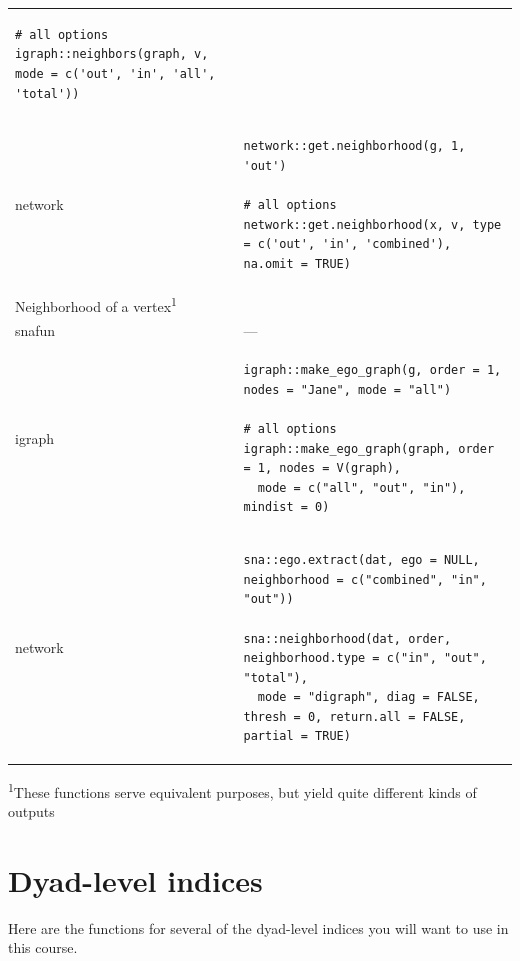 \documentclass[
]{article}
\begin{document}
\begin{longtable}{ll}
\begin{verbatim}
# all options
igraph::neighbors(graph, v, mode = c('out', 'in', 'all', 'total'))
\end{verbatim} \\ 
network & \begin{verbatim}
network::get.neighborhood(g, 1, 'out')

# all options
network::get.neighborhood(x, v, type = c('out', 'in', 'combined'), na.omit = TRUE)
\end{verbatim} \\ 
\midrule
\multicolumn{1}{l}{Neighborhood of a vertex\textsuperscript{1}} \\ 
\midrule
snafun & — \\ 
igraph & \begin{verbatim}
igraph::make_ego_graph(g, order = 1, nodes = "Jane", mode = "all")

# all options
igraph::make_ego_graph(graph, order = 1, nodes = V(graph),
  mode = c("all", "out", "in"), mindist = 0)
\end{verbatim} \\ 
network & \begin{verbatim}
sna::ego.extract(dat, ego = NULL, neighborhood = c("combined", "in", "out"))

sna::neighborhood(dat, order, neighborhood.type = c("in", "out", "total"),
  mode = "digraph", diag = FALSE, thresh = 0, return.all = FALSE, partial = TRUE)
\end{verbatim} \\ 
\bottomrule
\end{longtable}
\begin{minipage}{\linewidth}
\textsuperscript{1}These functions serve equivalent purposes, but yield quite different kinds of outputs\\
\end{minipage}

\hypertarget{dyad-level-indices}{%
\section{Dyad-level indices}\label{dyad-level-indices}}

Here are the functions for several of the dyad-level indices you will
want to use in this course.
\end{document}
